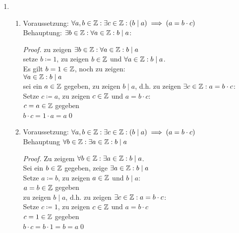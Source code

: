 \documentclass{gadsescript}
\begin{document}
\maketitle

\begin{enumerate}[label=(\alph*)]
	\item
		\begin{enumerate}[label=(\roman*)]
			\item Voraussetzung: $\forall a,b \in \mathbb{Z} : \exists c \in \mathbb{Z} : \left( b \mid a \right) \implies \left( a = b \cdot c \right) $\\
				Behauptung: $ \exists b \in \mathbb{Z} : \forall a \in \mathbb{Z} : b \mid a $:
				\begin{proof}
					zu zeigen $\exists b \in \mathbb{Z} : \forall a \in \mathbb{Z} : b \mid a$\\
					setze $ b \coloneqq 1 $, zu zeigen $ b \in \mathbb{Z} $ und $ \forall a \in \mathbb{Z} : b \mid a $.\\
					Es gilt $  b = 1 \in \mathbb{Z} $, noch zu zeigen:\\
					$\forall a \in \mathbb{Z} : b \mid a $\\
					sei ein  $ a \in \mathbb{Z} $ gegeben, zu zeigen $ b \mid a $, d.h. zu zeigen $ \exists c \in \mathbb{Z} : a = b \cdot c $:\\
					Setze $ c \coloneqq a $, zu zeigen $ c \in \mathbb{Z} $ und $ a = b \cdot c $:\\
					$ c = a \in \mathbb{Z} $ gegeben\\
					$ b \cdot c = 1 \cdot a = a $\qed
				\end{proof}
			\item Voraussetzung: $\forall a,b \in \mathbb{Z} : \exists c \in \mathbb{Z} : \left( b \mid a \right) \implies \left( a = b \cdot c \right) $\\
				Behauptung $ \forall b \in \mathbb{Z} : \exists a \in \mathbb{Z} : b \mid a $
				\begin{proof}
					Zu zeigem $ \forall b \in \mathbb{Z} : \exists a \in \mathbb{Z} : b \mid a $.\\
					Sei ein $ b \in \mathbb{Z} $ gegeben, zeige $ \exists a \in \mathbb{Z} : b \mid a$\\
					Setze $ a \coloneqq b $, zu zeigen $ a \in \mathbb{Z} $ und $ b \mid a $:\\
					$ a = b \in \mathbb{Z} $ gegeben\\
					zu zeigen $ b \mid a $, d.h. zu zeigen $ \exists c \in \mathbb{Z} : a = b \cdot c $:\\
					Setze $ c \coloneqq 1 $, zu zeigen $ c \in \mathbb{Z} $ und $ a = b \cdot c $\\
					$ c = 1 \in \mathbb{Z} $ gegeben\\
					$ b \cdot c = b \cdot 1 = b = a $\qed
				\end{proof}


\end{enumerate}
\end{enumerate}
\end{document}
